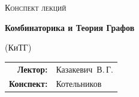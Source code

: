 
\begin{titlepage}
  \centering
  \vspace*{2cm}

  {\Large\scshape Конспект лекций\par}
  \vspace{1.5cm}

  {\Huge\bfseries Комбинаторика и Теория Графов\par}
  \vspace{0.5cm}
  {\Large (КиТГ)\par}

  \vspace{2cm}

  {\large
    \begin{tabular}{rl}
      \textbf{Лектор:}  & Казакевич~В.\,Г. \\[6pt]
      \textbf{Конспект:} & Котельников \\
    \end{tabular}
  \par}

  \vfill

  {\large \the\year\par}
\end{titlepage}
